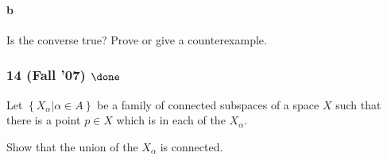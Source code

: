 \hypertarget{b}{%
\paragraph{b}\label{b}}

Is the converse true? Prove or give a counterexample.

\hypertarget{fall-07-done}{%
\subsubsection{\texorpdfstring{14 (Fall '07)
\(\done\)}{14 (Fall '07) \textbackslash done}}\label{fall-07-done}}

Let \(\left\{{X_\alpha \mathrel{\Big|}\alpha \in A}\right\}\) be a
family of connected subspaces of a space \(X\) such that there is a
point \(p \in X\) which is in each of the \(X_\alpha\).

Show that the union of the \(X_\alpha\) is connected.


